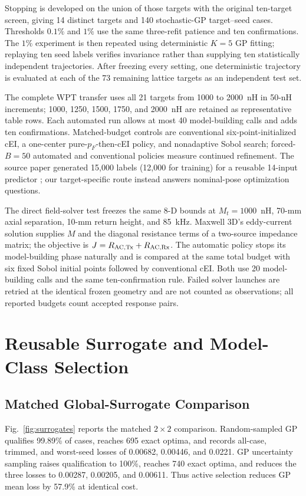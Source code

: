 \documentclass[conference]{IEEEtran}
\begin{document}
Stopping is developed on the union of those targets with the original ten-target screen, giving 14 distinct targets and 140 stochastic-GP target--seed cases. Thresholds $0.1\%$ and $1\%$ use the same three-refit patience and ten confirmations. The $1\%$ experiment is then repeated using deterministic $K=5$ GP fitting; replaying ten seed labels verifies invariance rather than supplying ten statistically independent trajectories. After freezing every setting, one deterministic trajectory is evaluated at each of the 73 remaining lattice targets as an independent test set.

The complete WPT transfer uses all 21 targets from 1000 to 2000~nH in 50-nH increments; 1000, 1250, 1500, 1750, and 2000~nH are retained as representative table rows. Each automated run allows at most 40 model-building calls and adds ten confirmations. Matched-budget controls are conventional six-point-initialized cEI, a one-center pure-$p_F$-then-cEI policy, and nonadaptive Sobol search; forced-$B=50$ automated and conventional policies measure continued refinement. The source paper generated 15,000 labels (12,000 for training) for a reusable 14-input predictor \cite{asadi2025}; our target-specific route instead answers nominal-pose optimization questions.

The direct field-solver test freezes the same 8-D bounds at $M_t=1000$~nH, 70-mm axial separation, 10-mm return height, and 85~kHz. Maxwell 3D's eddy-current solution supplies $M$ and the diagonal resistance terms of a two-source impedance matrix; the objective is $J=R_{\rm AC,Tx}+R_{\rm AC,Rx}$. The automatic policy stops its model-building phase naturally and is compared at the same total budget with six fixed Sobol initial points followed by conventional cEI. Both use 20 model-building calls and the same ten-confirmation rule. Failed solver launches are retried at the identical frozen geometry and are not counted as observations; all reported budgets count accepted response pairs.

\section{Reusable Surrogate and Model-Class Selection}
\subsection{Matched Global-Surrogate Comparison}
Fig.~\ref{fig:surrogates} reports the matched $2\times2$ comparison. Random-sampled GP qualifies 99.89\% of cases, reaches 695 exact optima, and records all-case, trimmed, and worst-seed losses of 0.00682, 0.00446, and 0.0221. GP uncertainty sampling raises qualification to 100\%, reaches 740 exact optima, and reduces the three losses to 0.00287, 0.00205, and 0.00611. Thus active selection reduces GP mean loss by 57.9\% at identical cost.
\end{document}
